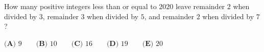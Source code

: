 How many positive integers less than or equal to $2020$ leave remainder $2$ when divided by $3$, remainder $3$ when divided by $5$, and remainder $2$ when divided by $7$?

$\textbf{(A) }9\qquad\textbf{(B) }10\qquad\textbf{(C) }16\qquad\textbf{(D) }19\qquad\textbf{(E) }20$
